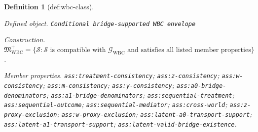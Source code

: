 \documentclass{article}
\newtheorem{definition}{Definition}
\begin{document}
\begin{definition}[def:wbc-class]\label{def:wbc-class}
\par\smallskip\noindent\emph{Defined object.} \texttt{Conditional bridge-\allowbreak{}supported WBC envelope}
\par\smallskip\noindent\emph{Construction.} \(\mathfrak M_{\mathrm{WBC}}^{+}=\{\mathcal S:\mathcal S\text{ is compatible with }\mathcal G_{\mathrm{WBC}}\text{ and satisfies all listed member properties}\}\).
\par\smallskip\noindent\emph{Member properties.} \texttt{ass:\allowbreak{}treatment-\allowbreak{}consistency}; \texttt{ass:\allowbreak{}z-\allowbreak{}consistency}; \texttt{ass:\allowbreak{}w-\allowbreak{}consistency}; \texttt{ass:\allowbreak{}m-\allowbreak{}consistency}; \texttt{ass:\allowbreak{}y-\allowbreak{}consistency}; \texttt{ass:\allowbreak{}a0-\allowbreak{}bridge-\allowbreak{}denominators}; \texttt{ass:\allowbreak{}a1-\allowbreak{}bridge-\allowbreak{}denominators}; \texttt{ass:\allowbreak{}sequential-\allowbreak{}treatment}; \texttt{ass:\allowbreak{}sequential-\allowbreak{}outcome}; \texttt{ass:\allowbreak{}sequential-\allowbreak{}mediator}; \texttt{ass:\allowbreak{}cross-\allowbreak{}world}; \texttt{ass:\allowbreak{}z-\allowbreak{}proxy-\allowbreak{}exclusion}; \texttt{ass:\allowbreak{}w-\allowbreak{}proxy-\allowbreak{}exclusion}; \texttt{ass:\allowbreak{}latent-\allowbreak{}a0-\allowbreak{}transport-\allowbreak{}support}; \texttt{ass:\allowbreak{}latent-\allowbreak{}a1-\allowbreak{}transport-\allowbreak{}support}; \texttt{ass:\allowbreak{}latent-\allowbreak{}valid-\allowbreak{}bridge-\allowbreak{}existence}.
\end{definition}
\end{document}
